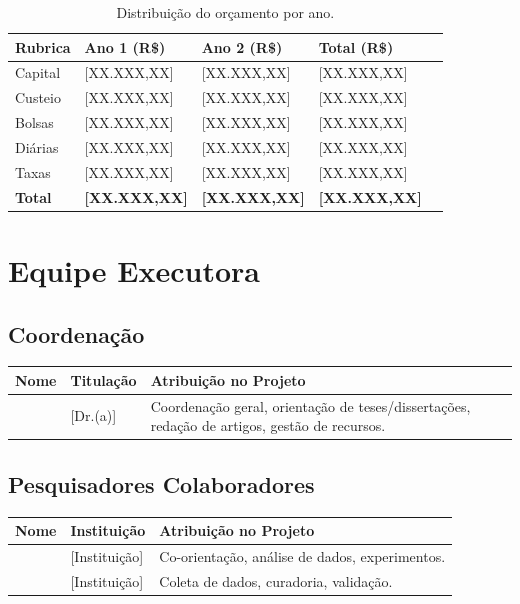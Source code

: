 \documentclass[
  12pt,
  a4paper,
  oneside,
  english,      %
  brazil
]{article}
\begin{document}
\begin{table}[H]
  \centering
  \caption{Distribuição do orçamento por ano.}
  \label{tab:orcamento-anual}
  \begin{tabularx}{\textwidth}{lXXXX}
    \toprule
    \textbf{Rubrica} &
    \textbf{Ano 1 (R\$)} & \textbf{Ano 2 (R\$)} & \textbf{Total (R\$)} \\
    \midrule
    Capital     & [XX.XXX,XX] & [XX.XXX,XX] & [XX.XXX,XX] \\
    Custeio     & [XX.XXX,XX] & [XX.XXX,XX] & [XX.XXX,XX] \\
    Bolsas      & [XX.XXX,XX] & [XX.XXX,XX] & [XX.XXX,XX] \\
    Diárias     & [XX.XXX,XX] & [XX.XXX,XX] & [XX.XXX,XX] \\
    Taxas       & [XX.XXX,XX] & [XX.XXX,XX] & [XX.XXX,XX] \\
    \midrule
    \textbf{Total} & \textbf{[XX.XXX,XX]} & \textbf{[XX.XXX,XX]} &
    \textbf{[XX.XXX,XX]} \\
    \bottomrule
  \end{tabularx}
\end{table}

\newpage
\section{Equipe Executora}

\subsection{Coordenação}

\begin{tabularx}{\textwidth}{llX}
  \toprule
  \textbf{Nome} & \textbf{Titulação} & \textbf{Atribuição no Projeto} \\
  \midrule
  [Coordenador(a)] & [Dr.(a)] & Coordenação geral, orientação de
  teses/dissertações, redação de artigos, gestão de recursos. \\
  \bottomrule
\end{tabularx}

\subsection{Pesquisadores Colaboradores}

\begin{tabularx}{\textwidth}{llX}
  \toprule
  \textbf{Nome} & \textbf{Instituição} & \textbf{Atribuição no Projeto} \\
  \midrule
  [Colaborador 1] & [Instituição] & Co-orientação, análise de dados,
  experimentos. \\
  [Colaborador 2] & [Instituição] & Coleta de dados, curadoria,
  validação. \\
  \bottomrule
\end{tabularx}
\end{document}
